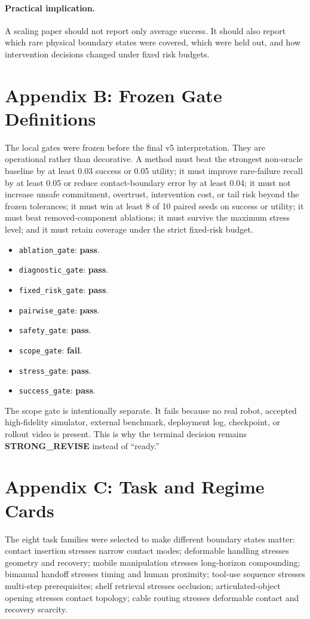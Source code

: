 \documentclass{article}
\begin{document}
\paragraph{Practical implication.} A scaling paper should not report only average success. It should also report which rare physical boundary states were covered, which were held out, and how intervention decisions changed under fixed risk budgets.


\section{Appendix B: Frozen Gate Definitions}
The local gates were frozen before the final v5 interpretation. They are operational rather than decorative. A method must beat the strongest non-oracle baseline by at least 0.03 success or 0.05 utility; it must improve rare-failure recall by at least 0.05 or reduce contact-boundary error by at least 0.04; it must not increase unsafe commitment, overtrust, intervention cost, or tail risk beyond the frozen tolerances; it must win at least 8 of 10 paired seeds on success or utility; it must beat removed-component ablations; it must survive the maximum stress level; and it must retain coverage under the strict fixed-risk budget.

\begin{itemize}
\item \texttt{ablation\_gate}: \textbf{pass}.
\item \texttt{diagnostic\_gate}: \textbf{pass}.
\item \texttt{fixed\_risk\_gate}: \textbf{pass}.
\item \texttt{pairwise\_gate}: \textbf{pass}.
\item \texttt{safety\_gate}: \textbf{pass}.
\item \texttt{scope\_gate}: \textbf{fail}.
\item \texttt{stress\_gate}: \textbf{pass}.
\item \texttt{success\_gate}: \textbf{pass}.
\end{itemize}

The scope gate is intentionally separate. It fails because no real robot, accepted high-fidelity simulator, external benchmark, deployment log, checkpoint, or rollout video is present. This is why the terminal decision remains \textbf{STRONG\_REVISE} instead of ``ready.''


\section{Appendix C: Task and Regime Cards}
The eight task families were selected to make different boundary states matter: contact insertion stresses narrow contact modes; deformable handling stresses geometry and recovery; mobile manipulation stresses long-horizon compounding; bimanual handoff stresses timing and human proximity; tool-use sequence stresses multi-step prerequisites; shelf retrieval stresses occlusion; articulated-object opening stresses contact topology; cable routing stresses deformable contact and recovery scarcity.
\end{document}
